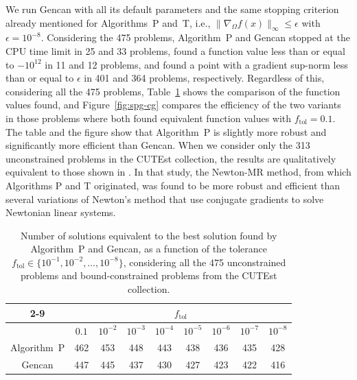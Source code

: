 \documentclass[11pt]{article}
\newcommand{\ftol}{f_{\mathrm{tol}}}
\begin{document}
We run Gencan with all its default parameters and the same stopping criterion already mentioned for Algorithms~P and~T, i.e., $\| \nabla_{\Omega} f(x) \|_{\infty} \leq \epsilon$ with $\epsilon = 10^{-8}$. Considering the 475 problems, Algorithm~P and Gencan stopped at the CPU time limit in 25 and 33 problems, found a function value less than or equal to $-10^{12}$ in 11 and 12 problems, and found a point with a gradient sup-norm less than or equal to $\epsilon$ in 401 and 364 problems, respectively. Regardless of this, considering all the 475 problems, Table~\ref{tab:spg-cg} shows the comparison of the function values found, and Figure~\ref{fig:spg-cg} compares the efficiency of the two variants in those problems where both found equivalent function values with $\ftol=0.1$. The table and the figure show that Algorithm~P is slightly more robust and significantly more efficient than Gencan. When we consider only the 313 unconstrained problems in the CUTEst collection, the results are qualitatively equivalent to those shown in \cite{Liu2023}. In that study, the Newton-MR method, from which Algorithms P and T originated, was found to be more robust and efficient than several variations of Newton's method that use conjugate gradients to solve Newtonian linear systems.

\begin{table}[ht!]
\begin{center}
{\small
\begin{tabular}{ccccccccc}
\cline{2-9}
& \multicolumn{8}{c}{$\ftol$} \\ 
\hline
& $0.1$ & $10^{-2}$ & $10^{-3}$ & $10^{-4}$ & $10^{-5}$ & $10^{-6}$ & $10^{-7}$ & $10^{-8}$ \\
\hline
Algorithm~P & 462 & 453 & 448 & 443 & 438 & 436 & 435 & 428 \\
Gencan      & 447 & 445 & 437 & 430 & 427 & 423 & 422 & 416 \\
\hline
\end{tabular}}
\end{center}
\caption{Number of solutions equivalent to the best solution found by Algorithm~P and Gencan, as a function of the tolerance $\ftol \in \{10^{-1}, 10^{-2} ,\dots,10^{-8}\}$, considering all the 475 unconstrained problems and bound-constrained problems from the CUTEst collection.}
\label{tab:spg-cg}
\end{table}
\end{document}
